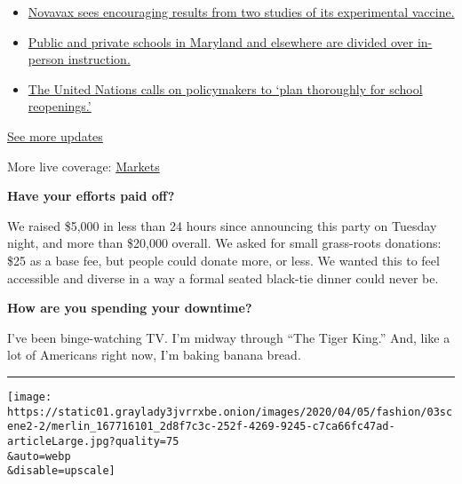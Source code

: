 \begin{itemize}
\tightlist
\item
  \href{https://www.nytimes3xbfgragh.onion/2020/08/04/world/coronavirus-cases.html?action=click\&pgtype=Article\&state=default\&region=MAIN_CONTENT_1\&context=storylines_live_updates\#link-1228a480}{Novavax
  sees encouraging results from two studies of its experimental
  vaccine.}
\item
  \href{https://www.nytimes3xbfgragh.onion/2020/08/04/world/coronavirus-cases.html?action=click\&pgtype=Article\&state=default\&region=MAIN_CONTENT_1\&context=storylines_live_updates\#link-4825b93}{Public
  and private schools in Maryland and elsewhere are divided over
  in-person instruction.}
\item
  \href{https://www.nytimes3xbfgragh.onion/2020/08/04/world/coronavirus-cases.html?action=click\&pgtype=Article\&state=default\&region=MAIN_CONTENT_1\&context=storylines_live_updates\#link-50f7386d}{The
  United Nations calls on policymakers to `plan thoroughly for school
  reopenings.'}
\end{itemize}

\href{https://www.nytimes3xbfgragh.onion/2020/08/04/world/coronavirus-cases.html?action=click\&pgtype=Article\&state=default\&region=MAIN_CONTENT_1\&context=storylines_live_updates}{See
more updates}

More live coverage:
\href{https://www.nytimes3xbfgragh.onion/live/2020/08/04/business/stock-market-today-coronavirus?action=click\&pgtype=Article\&state=default\&region=MAIN_CONTENT_1\&context=storylines_live_updates}{Markets}

\textbf{Have your efforts paid off?}

We raised \$5,000 in less than 24 hours since announcing this party on
Tuesday night, and more than \$20,000 overall. We asked for small
grass-roots donations: \$25 as a base fee, but people could donate more,
or less. We wanted this to feel accessible and diverse in a way a formal
seated black-tie dinner could never be.

\textbf{How are you spending your downtime?}

I've been binge-watching TV. I'm midway through ``The Tiger King.'' And,
like a lot of Americans right now, I'm baking banana bread.

\begin{center}\rule{0.5\linewidth}{\linethickness}\end{center}

\texttt{[image: https://static01.graylady3jvrrxbe.onion/images/2020/04/05/fashion/03scene2-2/merlin\_167716101\_2d8f7c3c-252f-4269-9245-c7ca66fc47ad-articleLarge.jpg?quality=75\\\&auto=webp\\\&disable=upscale]}

